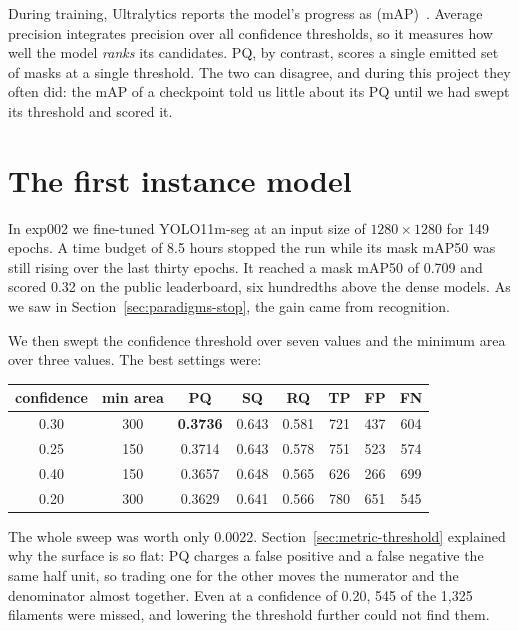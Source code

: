 During training, Ultralytics reports the model's progress as 
(mAP)~\citep{everingham2010,coco}. Average precision integrates precision over all confidence thresholds, so it measures how well
the model \emph{ranks} its candidates. PQ, by contrast, scores a single emitted set of masks at a
single threshold. The two can disagree, and during this project they often did: the mAP of a
checkpoint told us little about its PQ until we had swept its threshold and scored it.

\section{The first instance model}\label{sec:yolo-exp002}
In exp002 we fine-tuned YOLO11m-seg at an input size of $1280\times1280$ for 149 epochs. A time
budget of 8.5 hours stopped the run while its mask mAP50 was still rising over the last thirty
epochs. It reached a mask mAP50 of 0.709 and scored 0.32 on the public leaderboard, six hundredths
above the dense models. As we saw in Section~\ref{sec:paradigms-stop}, the gain came from
recognition.

We then swept the confidence threshold over seven values and the minimum area over three values. The
best settings were:
\begin{center}\small
\begin{tabular}{@{}cccccccc@{}}
\toprule
confidence & min area & PQ & SQ & RQ & TP & FP & FN \\
\midrule
0.30 & 300 & \textbf{0.3736} & 0.643 & 0.581 & 721 & 437 & 604 \\
0.25 & 150 & 0.3714 & 0.643 & 0.578 & 751 & 523 & 574 \\
0.40 & 150 & 0.3657 & 0.648 & 0.565 & 626 & 266 & 699 \\
0.20 & 300 & 0.3629 & 0.641 & 0.566 & 780 & 651 & 545 \\
\bottomrule
\end{tabular}
\end{center}
The whole sweep was worth only $0.0022$. Section~\ref{sec:metric-threshold} explained why the
surface is so flat: PQ charges a false positive and a false negative the same half unit, so trading
one for the other moves the numerator and the denominator almost together. Even at a confidence of
0.20, 545 of the 1,325 filaments were missed, and lowering the threshold further could not find them.

